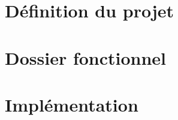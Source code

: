 \documentclass[11pt,fleqn]{book} %
\begin{document}


\newpage



\pagestyle{empty} %
\tableofcontents %
\cleardoublepage %
\pagestyle{fancy} %


\part{Définition du projet}






\part{Dossier fonctionnel}



\part{Implémentation}


 

\end{document}
